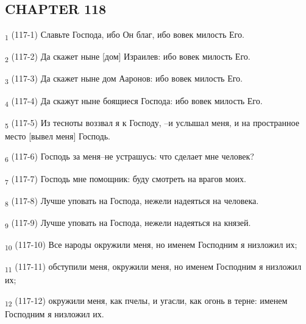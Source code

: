\subsection{CHAPTER 118}
\begin{tcolorbox}
\textsubscript{1} (117-1) Славьте Господа, ибо Он благ, ибо вовек милость Его.
\end{tcolorbox}
\begin{tcolorbox}
\textsubscript{2} (117-2) Да скажет ныне [дом] Израилев: ибо вовек милость Его.
\end{tcolorbox}
\begin{tcolorbox}
\textsubscript{3} (117-3) Да скажет ныне дом Ааронов: ибо вовек милость Его.
\end{tcolorbox}
\begin{tcolorbox}
\textsubscript{4} (117-4) Да скажут ныне боящиеся Господа: ибо вовек милость Его.
\end{tcolorbox}
\begin{tcolorbox}
\textsubscript{5} (117-5) Из тесноты воззвал я к Господу, --и услышал меня, и на пространное место [вывел меня] Господь.
\end{tcolorbox}
\begin{tcolorbox}
\textsubscript{6} (117-6) Господь за меня--не устрашусь: что сделает мне человек?
\end{tcolorbox}
\begin{tcolorbox}
\textsubscript{7} (117-7) Господь мне помощник: буду смотреть на врагов моих.
\end{tcolorbox}
\begin{tcolorbox}
\textsubscript{8} (117-8) Лучше уповать на Господа, нежели надеяться на человека.
\end{tcolorbox}
\begin{tcolorbox}
\textsubscript{9} (117-9) Лучше уповать на Господа, нежели надеяться на князей.
\end{tcolorbox}
\begin{tcolorbox}
\textsubscript{10} (117-10) Все народы окружили меня, но именем Господним я низложил их;
\end{tcolorbox}
\begin{tcolorbox}
\textsubscript{11} (117-11) обступили меня, окружили меня, но именем Господним я низложил их;
\end{tcolorbox}
\begin{tcolorbox}
\textsubscript{12} (117-12) окружили меня, как пчелы, и угасли, как огонь в терне: именем Господним я низложил их.
\end{tcolorbox}
